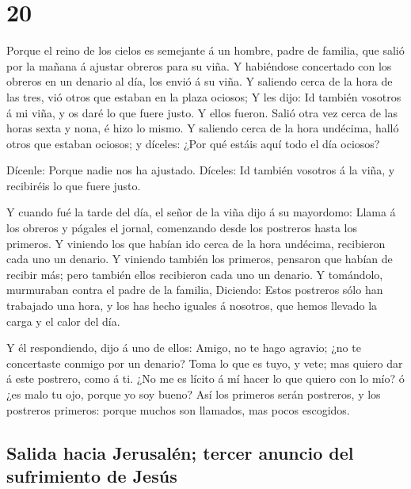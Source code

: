 \hypertarget{section-19}{%
\section{20}\label{section-19}}

 Porque el reino de los cielos es semejante á un hombre,
padre de familia, que salió por la mañana á ajustar obreros para su
viña.  Y habiéndose concertado con los obreros en un denario
al día, los envió á su viña.  Y saliendo cerca de la hora de
las tres, vió otros que estaban en la plaza ociosos;  Y les
dijo: Id también vosotros á mi viña, y os daré lo que fuere justo. Y
ellos fueron.  Salió otra vez cerca de las horas sexta y
nona, é hizo lo mismo.  Y saliendo cerca de la hora
undécima, halló otros que estaban ociosos; y díceles: ¿Por qué estáis
aquí todo el día ociosos?

 Dícenle: Porque nadie nos ha ajustado. Díceles: Id también
vosotros á la viña, y recibiréis lo que fuere justo.

 Y cuando fué la tarde del día, el señor de la viña dijo á
su mayordomo: Llama á los obreros y págales el jornal, comenzando desde
los postreros hasta los primeros.  Y viniendo los que habían
ido cerca de la hora undécima, recibieron cada uno un denario.
 Y viniendo también los primeros, pensaron que habían de
recibir más; pero también ellos recibieron cada uno un denario.
 Y tomándolo, murmuraban contra el padre de la familia,
 Diciendo: Estos postreros sólo han trabajado una hora, y
los has hecho iguales á nosotros, que hemos llevado la carga y el calor
del día.

 Y él respondiendo, dijo á uno de ellos: Amigo, no te hago
agravio; ¿no te concertaste conmigo por un denario?  Toma
lo que es tuyo, y vete; mas quiero dar á este postrero, como á ti.
 ¿No me es lícito á mí hacer lo que quiero con lo mío? ó
¿es malo tu ojo, porque yo soy bueno?  Así los primeros
serán postreros, y los postreros primeros: porque muchos son llamados,
mas pocos escogidos.

\hypertarget{salida-hacia-jerusaluxe9n-tercer-anuncio-del-sufrimiento-de-jesuxfas}{%
\subsection{Salida hacia Jerusalén; tercer anuncio del sufrimiento de
Jesús}\label{salida-hacia-jerusaluxe9n-tercer-anuncio-del-sufrimiento-de-jesuxfas}}

